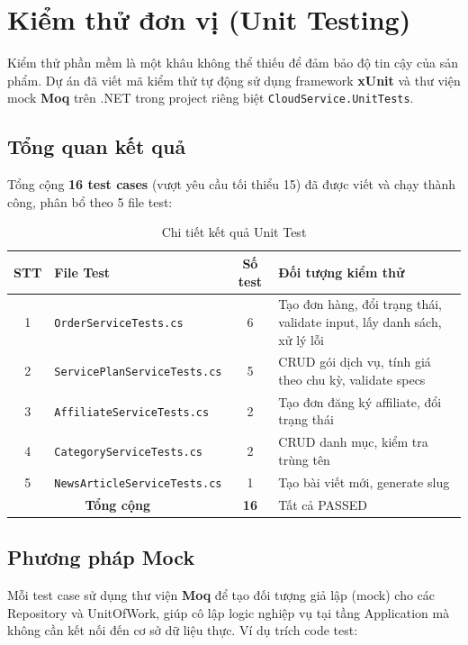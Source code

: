 \section{Kiểm thử đơn vị (Unit Testing)}
Kiểm thử phần mềm là một khâu không thể thiếu để đảm bảo độ tin cậy của sản phẩm. Dự án đã viết mã kiểm thử tự động sử dụng framework \textbf{xUnit} và thư viện mock \textbf{Moq} trên .NET trong project riêng biệt \texttt{CloudService.UnitTests}.

\subsection{Tổng quan kết quả}
Tổng cộng \textbf{16 test cases} (vượt yêu cầu tối thiểu 15) đã được viết và chạy thành công, phân bổ theo 5 file test:

\begin{table}[htbp]
    \centering
    \caption{Chi tiết kết quả Unit Test}
    \label{tab:unit_tests}
    \begin{tabular}{|c|p{5cm}|c|p{5cm}|}
        \hline
        \textbf{STT} & \textbf{File Test} & \textbf{Số test} & \textbf{Đối tượng kiểm thử} \\
        \hline
        1 & \texttt{OrderServiceTests.cs} & 6 & Tạo đơn hàng, đổi trạng thái, validate input, lấy danh sách, xử lý lỗi \\
        \hline
        2 & \texttt{ServicePlanServiceTests.cs} & 5 & CRUD gói dịch vụ, tính giá theo chu kỳ, validate specs \\
        \hline
        3 & \texttt{AffiliateServiceTests.cs} & 2 & Tạo đơn đăng ký affiliate, đổi trạng thái \\
        \hline
        4 & \texttt{CategoryServiceTests.cs} & 2 & CRUD danh mục, kiểm tra trùng tên \\
        \hline
        5 & \texttt{NewsArticleServiceTests.cs} & 1 & Tạo bài viết mới, generate slug \\
        \hline
        \multicolumn{2}{|c|}{\textbf{Tổng cộng}} & \textbf{16} & Tất cả PASSED \\
        \hline
    \end{tabular}
\end{table}

\subsection{Phương pháp Mock}
Mỗi test case sử dụng thư viện \textbf{Moq} để tạo đối tượng giả lập (mock) cho các Repository và UnitOfWork, giúp cô lập logic nghiệp vụ tại tầng Application mà không cần kết nối đến cơ sở dữ liệu thực. Ví dụ trích code test:

